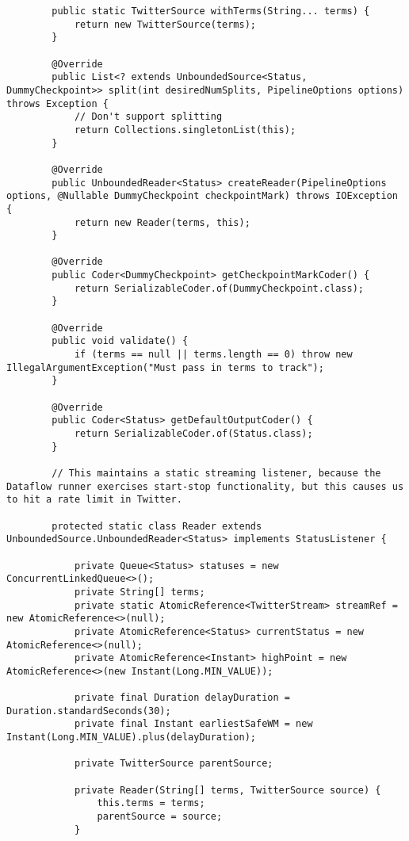 \begin{codelisting}
\begin{verbatim}
        public static TwitterSource withTerms(String... terms) {
            return new TwitterSource(terms);
        }

        @Override
        public List<? extends UnboundedSource<Status, DummyCheckpoint>> split(int desiredNumSplits, PipelineOptions options) throws Exception {
            // Don't support splitting
            return Collections.singletonList(this);
        }

        @Override
        public UnboundedReader<Status> createReader(PipelineOptions options, @Nullable DummyCheckpoint checkpointMark) throws IOException {
            return new Reader(terms, this);
        }

        @Override
        public Coder<DummyCheckpoint> getCheckpointMarkCoder() {
            return SerializableCoder.of(DummyCheckpoint.class);
        }

        @Override
        public void validate() {
            if (terms == null || terms.length == 0) throw new IllegalArgumentException("Must pass in terms to track");
        }

        @Override
        public Coder<Status> getDefaultOutputCoder() {
            return SerializableCoder.of(Status.class);
        }

        // This maintains a static streaming listener, because the Dataflow runner exercises start-stop functionality, but this causes us to hit a rate limit in Twitter.

        protected static class Reader extends UnboundedSource.UnboundedReader<Status> implements StatusListener {

            private Queue<Status> statuses = new ConcurrentLinkedQueue<>();
            private String[] terms;
            private static AtomicReference<TwitterStream> streamRef = new AtomicReference<>(null);
            private AtomicReference<Status> currentStatus = new AtomicReference<>(null);
            private AtomicReference<Instant> highPoint = new AtomicReference<>(new Instant(Long.MIN_VALUE));

            private final Duration delayDuration = Duration.standardSeconds(30);
            private final Instant earliestSafeWM = new Instant(Long.MIN_VALUE).plus(delayDuration);

            private TwitterSource parentSource;

            private Reader(String[] terms, TwitterSource source) {
                this.terms = terms;
                parentSource = source;
            }


\end{verbatim}
\end{codelisting}
